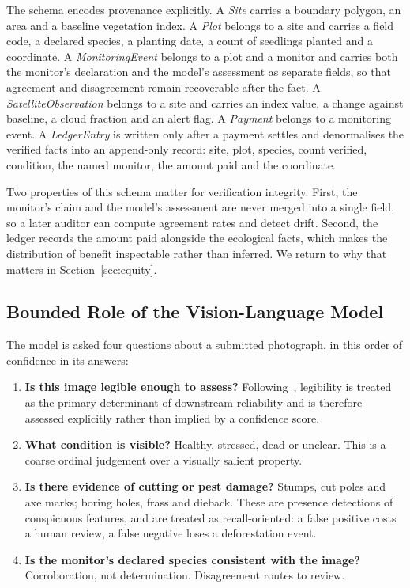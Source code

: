 \documentclass[10pt,twocolumn,a4paper]{article}
\begin{document}
The schema encodes provenance explicitly. A \emph{Site} carries a boundary
polygon, an area and a baseline vegetation index. A \emph{Plot} belongs to a
site and carries a field code, a declared species, a planting date, a count of
seedlings planted and a coordinate. A \emph{MonitoringEvent} belongs to a plot
and a monitor and carries both the monitor's declaration and the model's
assessment as separate fields, so that agreement and disagreement remain
recoverable after the fact. A \emph{SatelliteObservation} belongs to a site and
carries an index value, a change against baseline, a cloud fraction and an alert
flag. A \emph{Payment} belongs to a monitoring event. A \emph{LedgerEntry} is
written only after a payment settles and denormalises the verified facts into an
append-only record: site, plot, species, count verified, condition, the named
monitor, the amount paid and the coordinate.

Two properties of this schema matter for verification integrity. First, the
monitor's claim and the model's assessment are never merged into a single
field, so a later auditor can compute agreement rates and detect drift. Second,
the ledger records the amount paid alongside the ecological facts, which makes
the distribution of benefit inspectable rather than inferred. We return to why
that matters in Section~\ref{sec:equity}.

\subsection{Bounded Role of the Vision-Language Model}

The model is asked four questions about a submitted photograph, in this order of
confidence in its answers:

\begin{enumerate}[label=(\alph*)]
\item \textbf{Is this image legible enough to assess?} Following~\cite{zhou2026},
legibility is treated as the primary determinant of downstream reliability and
is therefore assessed explicitly rather than implied by a confidence score.
\item \textbf{What condition is visible?} Healthy, stressed, dead or unclear.
This is a coarse ordinal judgement over a visually salient property.
\item \textbf{Is there evidence of cutting or pest damage?} Stumps, cut poles and
axe marks; boring holes, frass and dieback. These are presence detections of
conspicuous features, and are treated as recall-oriented: a false positive costs
a human review, a false negative loses a deforestation event.
\item \textbf{Is the monitor's declared species consistent with the image?}
Corroboration, not determination. Disagreement routes to review.
\end{enumerate}
\end{document}

